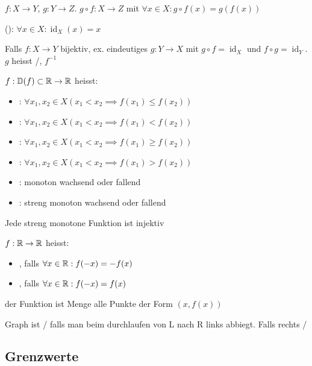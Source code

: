 \Def $f: X \to Y$, $g: Y \to Z$.  $g \circ f : X \to Z$ mit $\forall x \in X : g \circ f(x) = g(f(x))$

\Def {} (): $\forall x \in X : \operatorname{id}_X(x) = x$

\Satz Falls $f: X \to Y$ bijektiv, ex. eindeutiges $g: Y \to X$ mit $g \circ f = \operatorname{id}_X$ und $f \circ g = \operatorname{id}_Y$.
$g$ heisst /, $f^{-1}$

\begin{minipage}{\linewidth}
\Def $f: \mathbb{D}(f) \subset \mathbb{R} \to \mathbb{R}$ heisst:
\begin{itemize}
    \item {}: $\forall x_1, x_2 \in X (x_1 < x_2 \implies f(x_1)\le f(x_2))$
    \item {}: $\forall x_1, x_2 \in X (x_1 < x_2 \implies f(x_1) < f(x_2))$
    \item {}: $\forall x_1, x_2 \in X (x_1 < x_2 \implies f(x_1)\ge f(x_2))$
    \item {}: $\forall x_1, x_2 \in X (x_1 < x_2 \implies f(x_1) > f(x_2))$
    \item {}: monoton wachsend oder fallend
    \item {}: streng monoton wachsend oder fallend
\end{itemize}
\end{minipage}

\Satz Jede streng monotone Funktion ist injektiv

\Def $f: \mathbb{R} \to \mathbb{R}$ heisst:
\vspace{-0.6em}
\begin{itemize}
    \item {}, falls $\forall x \in \mathbb{R} : f(-x) = -f(x)$
    \item {}, falls $\forall x \in \mathbb{R} : f(-x) = f(x)$
\end{itemize}

\Def {} der Funktion ist Menge alle Punkte der Form $(x, f(x))$

\Def Graph ist / falls man beim durchlaufen von L nach R links abbiegt.
Falls rechts /

\subsection{Grenzwerte}

